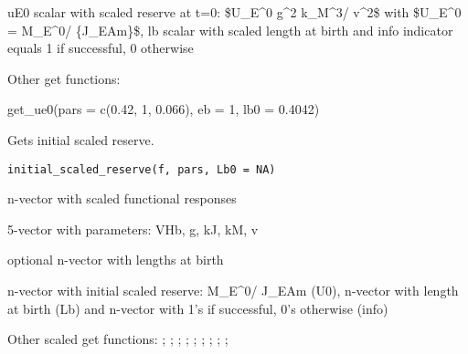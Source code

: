 \documentclass[a4paper]{book}
\begin{document}
%
\begin{Value}
uE0 scalar with scaled reserve at t=0: \$U\_E\textasciicircum{}0 g\textasciicircum{}2 k\_M\textasciicircum{}3/ v\textasciicircum{}2\$ with \$U\_E\textasciicircum{}0 = M\_E\textasciicircum{}0/ \{J\_EAm\}\$, lb scalar with scaled length at birth and info indicator equals 1 if successful, 0 otherwise
\end{Value}
%
\begin{SeeAlso}\relax
Other get functions: 
\end{SeeAlso}
%
\begin{Examples}
\begin{ExampleCode}
get_ue0(pars = c(0.42, 1, 0.066), eb = 1, lb0 = 0.4042)
\end{ExampleCode}
\end{Examples}
%
\begin{Description}\relax
Gets initial scaled reserve.
\end{Description}
%
\begin{Usage}
\begin{verbatim}
initial_scaled_reserve(f, pars, Lb0 = NA)
\end{verbatim}
\end{Usage}
%
\begin{Arguments}
\begin{ldescription}
\item[\code{f}] n-vector with scaled functional responses

\item[\code{pars}] 5-vector with parameters: VHb, g, kJ, kM, v

\item[\code{Lb0}] optional n-vector with lengths at birth
\end{ldescription}
\end{Arguments}
%
\begin{Value}
n-vector with initial scaled reserve: M\_E\textasciicircum{}0/ J\_EAm (U0), n-vector with length at birth (Lb) and n-vector with 1's if successful, 0's otherwise (info)
\end{Value}
%
\begin{SeeAlso}\relax
Other scaled get functions: ;
; ;
; ;
; ;
; ;
\end{SeeAlso}
\end{document}
